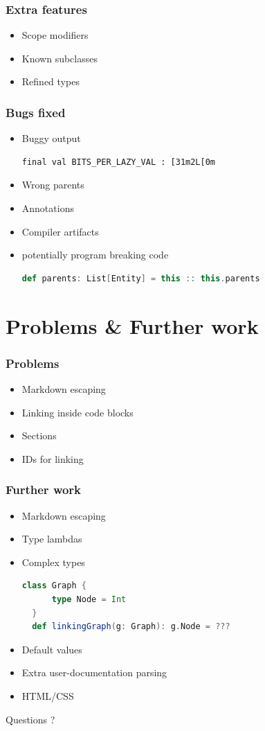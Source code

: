 \documentclass{beamer}
\begin{document}
\begin{frame}
  \frametitle{Extra features}
  \begin{itemize}
    \item Scope modifiers
    \item Known subclasses
    \item Refined types
  \end{itemize}
\end{frame}

\begin{frame}[fragile]
  \frametitle{Bugs fixed}
  \begin{itemize}
    \item Buggy output
\begin{lstlisting}
final val BITS_PER_LAZY_VAL : [31m2L[0m
\end{lstlisting}
    \item Wrong parents
    \item Annotations
    \item Compiler artifacts \pause
    \item potentially program breaking code
\begin{lstlisting}[language=scala]
def parents: List[Entity] = this :: this.parents
\end{lstlisting}
  \end{itemize}
\end{frame}

\section{Problems \& Further work}

\begin{frame}
  \frametitle{Problems}
  
  \begin{itemize}
    \item Markdown escaping 
    \item Linking inside code blocks 
    \item Sections 
    \item IDs for linking
  \end{itemize}
\end{frame}

\begin{frame}[fragile]
  \frametitle{Further work}
  
  \begin{itemize}
    \item Markdown escaping 
    \item Type lambdas
    \item Complex types
\begin{lstlisting}[language=scala]
  class Graph {
      type Node = Int
  }
  def linkingGraph(g: Graph): g.Node = ???    
\end{lstlisting}
    \item Default values 
    \item Extra user-documentation parsing 
    \item HTML/CSS
  \end{itemize}
\end{frame}

\begin{frame}
  \begin{center}
    \Huge{Questions ?}
  \end{center}
\end{frame}
\end{document}
